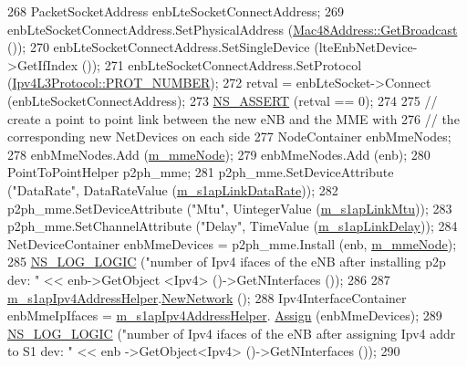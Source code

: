 \begin{DoxyCode}
268   PacketSocketAddress enbLteSocketConnectAddress;
269   enbLteSocketConnectAddress.SetPhysicalAddress (\hyperlink{classns3_1_1Mac48Address_a55156e302c6bf950c0b558365adbde84}{Mac48Address::GetBroadcast} ());
270   enbLteSocketConnectAddress.SetSingleDevice (lteEnbNetDevice->GetIfIndex ());
271   enbLteSocketConnectAddress.SetProtocol (\hyperlink{classns3_1_1Ipv4L3Protocol_a0146bc84815b7b73adb9c62cdafc9442}{Ipv4L3Protocol::PROT\_NUMBER});
272   retval = enbLteSocket->Connect (enbLteSocketConnectAddress);
273   \hyperlink{assert_8h_a6dccdb0de9b252f60088ce281c49d052}{NS\_ASSERT} (retval == 0);  
274   
275   \textcolor{comment}{// create a point to point link between the new eNB and the MME with}
276   \textcolor{comment}{// the corresponding new NetDevices on each side}
277   NodeContainer enbMmeNodes;
278   enbMmeNodes.Add (\hyperlink{classns3_1_1EmuEpcHelper_aef136870f0ad1c40d3e139f34ff9f5d1}{m\_mmeNode});
279   enbMmeNodes.Add (enb);
280   PointToPointHelper p2ph\_mme;
281   p2ph\_mme.SetDeviceAttribute (\textcolor{stringliteral}{"DataRate"}, DataRateValue (\hyperlink{classns3_1_1EmuEpcHelper_ac0b5058393492c89ecacfe6324cdef69}{m\_s1apLinkDataRate}));
282   p2ph\_mme.SetDeviceAttribute (\textcolor{stringliteral}{"Mtu"}, UintegerValue (\hyperlink{classns3_1_1EmuEpcHelper_a8ed5f99d60bfe51d3dac00c2ab445a17}{m\_s1apLinkMtu}));
283   p2ph\_mme.SetChannelAttribute (\textcolor{stringliteral}{"Delay"}, TimeValue (\hyperlink{classns3_1_1EmuEpcHelper_a9e719fe27e97da61af652e8fe47640b6}{m\_s1apLinkDelay}));  
284   NetDeviceContainer enbMmeDevices = p2ph\_mme.Install (enb, \hyperlink{classns3_1_1EmuEpcHelper_aef136870f0ad1c40d3e139f34ff9f5d1}{m\_mmeNode});
285   \hyperlink{group__logging_ga88acd260151caf2db9c0fc84997f45ce}{NS\_LOG\_LOGIC} (\textcolor{stringliteral}{"number of Ipv4 ifaces of the eNB after installing p2p dev: "} << enb->GetObject
      <Ipv4> ()->GetNInterfaces ());  
286 
287   \hyperlink{classns3_1_1EmuEpcHelper_af71f1e0e4c76588bf8c7565484614c08}{m\_s1apIpv4AddressHelper}.\hyperlink{classns3_1_1Ipv4AddressHelper_a3277d133ef0d2669934a16a8206ba8e4}{NewNetwork} ();
288   Ipv4InterfaceContainer enbMmeIpIfaces = \hyperlink{classns3_1_1EmuEpcHelper_af71f1e0e4c76588bf8c7565484614c08}{m\_s1apIpv4AddressHelper}.
      \hyperlink{classns3_1_1Ipv4AddressHelper_af8e7f4a1a7e74c00014a1eac445a27af}{Assign} (enbMmeDevices);
289   \hyperlink{group__logging_ga88acd260151caf2db9c0fc84997f45ce}{NS\_LOG\_LOGIC} (\textcolor{stringliteral}{"number of Ipv4 ifaces of the eNB after assigning Ipv4 addr to S1 dev: "} << enb
      ->GetObject<Ipv4> ()->GetNInterfaces ());
290   

\end{DoxyCode}
